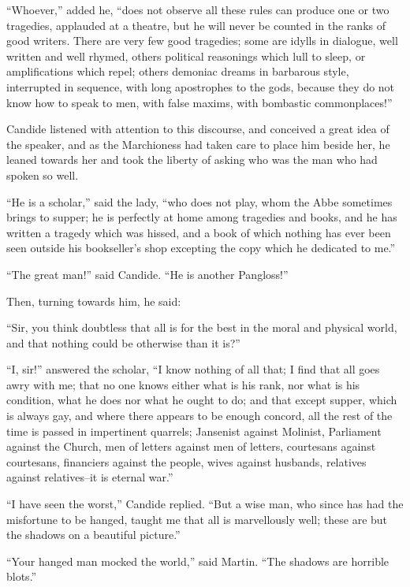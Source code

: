 ``Whoever,'' added he, ``does not observe all these rules can produce one or two tragedies, applauded at a theatre, but he will never be counted in the ranks of good writers. There are very few good tragedies; some are idylls in dialogue, well written and well rhymed, others political reasonings which lull to sleep, or amplifications which repel; others demoniac dreams in barbarous style, interrupted in sequence, with long apostrophes to the gods, because they do not know how to speak to men, with false maxims, with bombastic commonplaces!''

Candide listened with attention to this discourse, and conceived a great idea of the speaker, and as the Marchioness had taken care to place him beside her, he leaned towards her and took the liberty of asking who was the man who had spoken so well.

``He is a scholar,'' said the lady, ``who does not play, whom the Abbe sometimes brings to supper; he is perfectly at home among tragedies and books, and he has written a tragedy which was hissed, and a book of which nothing has ever been seen outside his bookseller's shop excepting the copy which he dedicated to me.''

``The great man!'' said Candide. ``He is another Pangloss!''

Then, turning towards him, he said:

``Sir, you think doubtless that all is for the best in the moral and physical world, and that nothing could be otherwise than it is?''

``I, sir!'' answered the scholar, ``I know nothing of all that; I find that all goes awry with me; that no one knows either what is his rank, nor what is his condition, what he does nor what he ought to do; and that except supper, which is always gay, and where there appears to be enough concord, all the rest of the time is passed in impertinent quarrels; Jansenist against Molinist, Parliament against the Church, men of letters against men of letters, courtesans against courtesans, financiers against the people, wives against husbands, relatives against relatives--it is eternal war.''

``I have seen the worst,'' Candide replied. ``But a wise man, who since has had the misfortune to be hanged, taught me that all is marvellously well; these are but the shadows on a beautiful picture.''

``Your hanged man mocked the world,'' said Martin. ``The shadows are horrible blots.''

